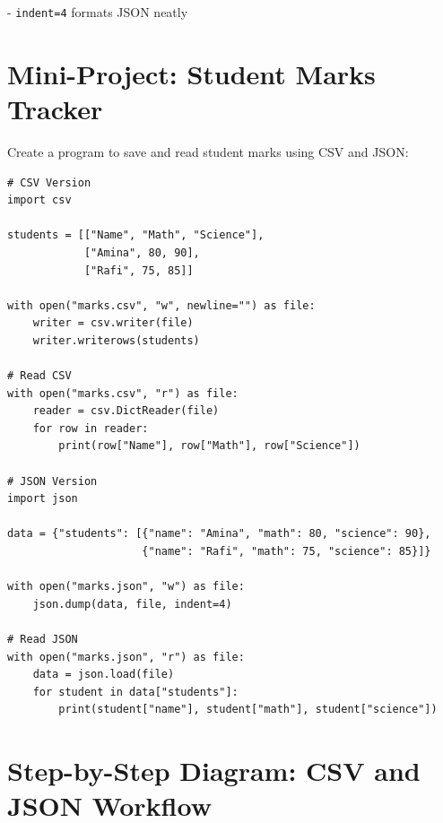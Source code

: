 - \texttt{indent=4} formats JSON neatly  

\section{Mini-Project: Student Marks Tracker}

Create a program to save and read student marks using CSV and JSON:

\begin{verbatim}
# CSV Version
import csv

students = [["Name", "Math", "Science"],
            ["Amina", 80, 90],
            ["Rafi", 75, 85]]

with open("marks.csv", "w", newline="") as file:
    writer = csv.writer(file)
    writer.writerows(students)

# Read CSV
with open("marks.csv", "r") as file:
    reader = csv.DictReader(file)
    for row in reader:
        print(row["Name"], row["Math"], row["Science"])

# JSON Version
import json

data = {"students": [{"name": "Amina", "math": 80, "science": 90},
                     {"name": "Rafi", "math": 75, "science": 85}]}

with open("marks.json", "w") as file:
    json.dump(data, file, indent=4)

# Read JSON
with open("marks.json", "r") as file:
    data = json.load(file)
    for student in data["students"]:
        print(student["name"], student["math"], student["science"])
\end{verbatim}

\section{Step-by-Step Diagram: CSV and JSON Workflow}

\begin{center}
\end{center}

